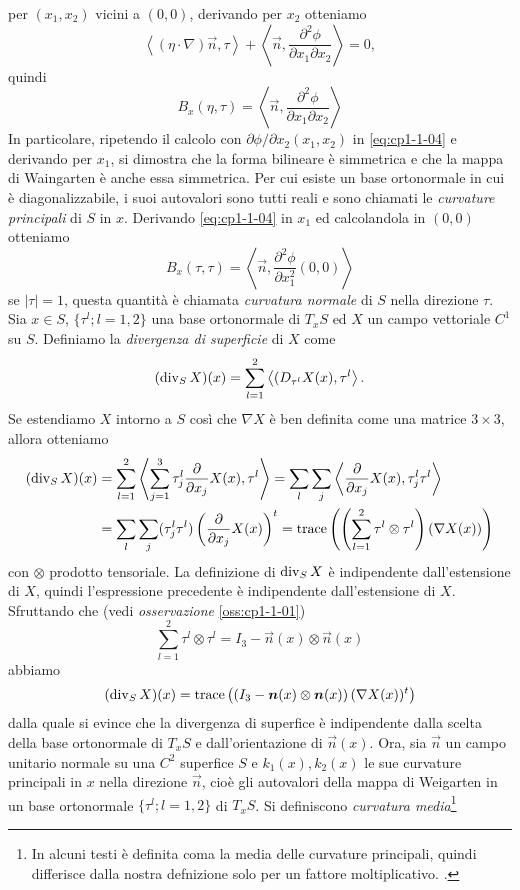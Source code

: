 per $(x_1,x_2)$ vicini a $(0,0)$, derivando per $x_2$  otteniamo
\[
\left<(\eta\cdot\nabla)\vec{n},\tau\right>+\left<\vec{n},\frac{\partial^2\phi}{\partial x_1\partial x_2}\right> = 0,
\]
quindi
\[
B_x(\eta,\tau)=\left<\vec{n},\frac{\partial^2\phi}{\partial x_1\partial x_2}\right>
\]
In particolare, ripetendo il calcolo con $\partial\phi/\partial x_2(x_1,x_2)$ in \eqref{eq:cp1-1-04} e derivando per $x_1$, si dimostra che la forma bilineare è simmetrica e che la mappa di Waingarten è anche essa simmetrica. Per cui esiste un base ortonormale in cui è diagonalizzabile, i suoi autovalori sono tutti reali e sono chiamati le \emph{curvature principali} di $S$ in $x$. Derivando \eqref{eq:cp1-1-04} in $x_1$ ed calcolandola in $(0,0)$ otteniamo
\[
B_x(\tau,\tau)=\left<\vec{n},\frac{\partial^2\phi}{\partial x_1^2}(0,0)\right>
\]
se $|\tau|=1$, questa quantità è chiamata \emph{curvatura normale} di $S$ nella direzione $\tau$. Sia $x\in S$, $\{\tau^l;l=1,2\}$ una base ortonormale di $T_xS$ ed  $X$ un campo vettoriale $C^1$ su $S$. Definiamo la \emph{divergenza di superficie} di $X$ come
\[
(\operatorname{div}_S X)(x) = \sum_{l=1}^2\left<(D_{\tau^l}X(x),\tau^l\right>.
\]
Se estendiamo $X$ intorno a $S$ così che $\nabla X$ è ben definita come una matrice $3\times 3$, allora otteniamo
\[
\begin{aligned}
(\operatorname{div}_S X)(x)&=\sum_{l=1}^2\left<\sum_{j=1}^3\tau_j^l\frac{\partial}{\partial x_j}X(x),\tau^l\right> =\sum_{l}\sum_{j}\left<\frac{\partial}{\partial x_j}X(x),\tau_j^l\tau^l\right> \\
&=\sum_{l}\sum_{j}(\tau_j^l\tau^l)\left(\frac{\partial}{\partial x_j}X(x)\right)^t=\operatorname{trace}\left(\left(\sum_{l=1}^2\tau^l\otimes\tau^l\right) (\nabla X(x))\right)
\end{aligned}
\]
con $\otimes$ prodotto tensoriale. La definizione di $\operatorname{div}_S X$ è indipendente dall'estensione di $X$, quindi l'espressione precedente è indipendente dall'estensione di $X$. Sfruttando che (vedi \emph{osservazione} \ref{oss:cp1-1-01})
\begin{equation}
\label{eq:cp1-1-05}
\sum_{l=1}^2\tau^l\otimes\tau^l = I_3 - \vec{n}(x)\otimes\vec{n}(x)
\end{equation}
abbiamo
\begin{equation}
(\operatorname{div}_S X)(x)=\operatorname{trace}\left(\left(I_3 - \bm{n}(x)\otimes\bm{n}(x)\right) (\nabla X(x))^t\right)
\end{equation}
dalla quale si evince che la divergenza di superfice è indipendente dalla scelta della base ortonormale di $T_xS$ e dall'orientazione di $\vec{n}(x)$.
Ora, sia $\vec{n}$ un campo unitario normale su una $C^2$ superfice $S$ e $k_1(x),k_2(x)$ le sue curvature principali in $x$ nella direzione $\vec{n}$, cioè gli autovalori della mappa di Weigarten in un base ortonormale $\{\tau^l;l=1,2\}$ di $T_xS$. Si definiscono \emph{curvatura media}\footnote{In alcuni testi è definita coma la media delle curvature principali, quindi differisce dalla nostra defnizione solo per un fattore moltiplicativo. \cite[][]{giga:main}.} \,%

